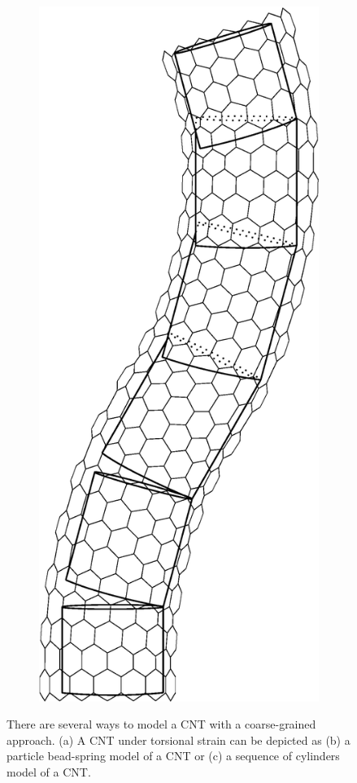 \begin{figure}[t!]
\begin{subfigure}[t]{.33\textwidth}
			\caption{\label{subfig:NanotubeParticle}}
		\end{subfigure}%
		~		
		\begin{subfigure}[t]{.33\textwidth}
			\centering
			\includegraphics[scale=.25]{./fig/ch1/NanotubeCylinder.eps}
			\caption{\label{subfig:NanotubeCylinder}}
		\end{subfigure}
		\caption{There are several ways to model a CNT with a coarse-grained approach. (a) A CNT under torsional strain can be depicted as (b) a particle bead-spring model of a CNT or (c) a sequence of cylinders model of a CNT. \label{fig:CoarseGrain}}	
	\end{figure}

